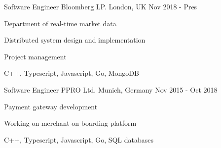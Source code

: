 

\begin{cventries}

  \cventry
    {Software Engineer} %
    {Bloomberg LP.} %
    {London, UK} %
    {Nov 2018 - Pres} %
    {
      \begin{cvitems} %
        \item {Department of real-time market data}
        \item {Distributed system design and implementation}
        \item {Project management}
        \item {C++, Typescript, Javascript, Go, MongoDB}
      \end{cvitems}
    }
  \cventry
    {Software Engineer} %
    {PPRO Ltd.} %
    {Munich, Germany} %
    {Nov 2015 - Oct 2018} %
    {
      \begin{cvitems} %
        \item {Payment gateway development}
        \item {Working on merchant on-boarding platform}
        \item {C++, Typescript, Javascript, Go, SQL databases}
      \end{cvitems}
    }

\end{cventries}
